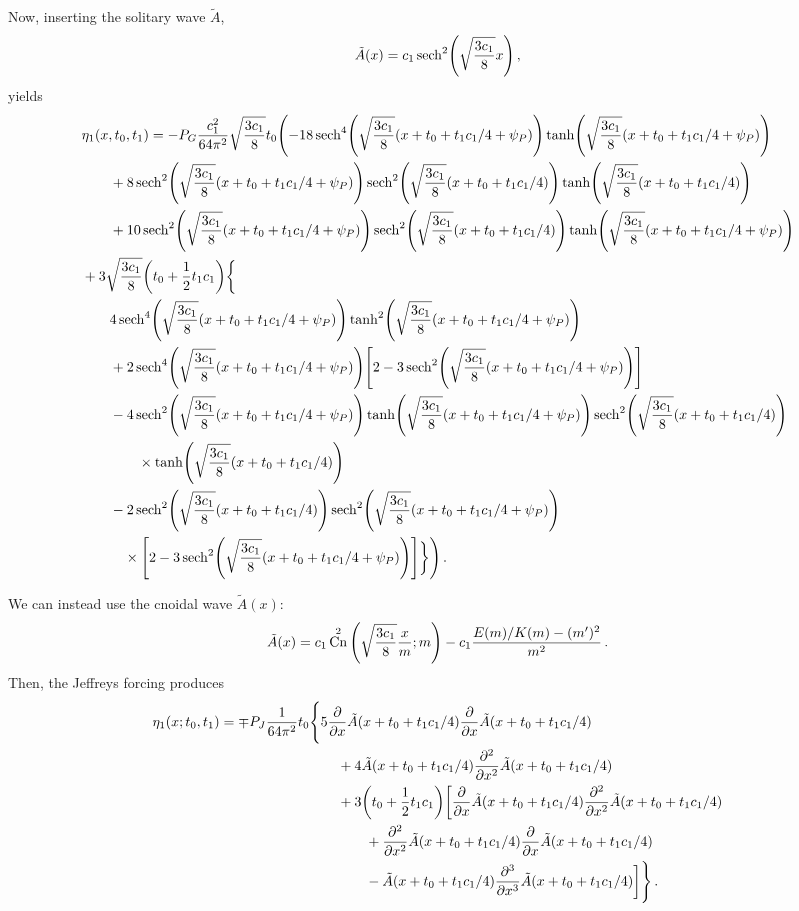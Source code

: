 \documentclass{jfm}
\DeclareMathOperator{\cn}{Cn}
\begin{document}
Now, inserting the solitary wave $\tilde{A}$,
\[
  \tilde{A}(x) = c_1 \sech[2](\sqrt{\frac{3 c_1}{8}} x) \,,
\]
yields
\begin{align*}
  &\eta_1(x,t_0,t_1) =
  -P_G \frac{c_1^2}{64 \pi^2} \sqrt{\frac{3 c_1}{8}} t_0
  \Biggl(
    -18 \sech[4](\sqrt{\frac{3 c_1}{8}} (x+t_0+t_1 c_1/4 + \psi_P))
    \tanh(\sqrt{\frac{3 c_1}{8}} (x+t_0+t_1 c_1/4 + \psi_P)) \\
  &\qquad
    +8 \sech[2](\sqrt{\frac{3 c_1}{8}} (x+t_0+t_1 c_1/4 + \psi_P))
    \sech[2](\sqrt{\frac{3 c_1}{8}} (x+t_0+t_1 c_1/4))
    \tanh(\sqrt{\frac{3 c_1}{8}} (x+t_0+t_1 c_1/4)) \\
  &\qquad
    +10 \sech[2](\sqrt{\frac{3 c_1}{8}} (x+t_0+t_1 c_1/4 + \psi_P))
    \sech[2](\sqrt{\frac{3 c_1}{8}} (x+t_0+t_1 c_1/4))
    \tanh(\sqrt{\frac{3 c_1}{8}} (x+t_0+t_1 c_1/4+\psi_P)) \\
  &
    + 3 \sqrt{\frac{3 c_1}{8}} \pqty{t_0+\frac{1}{2} t_1 c_1} \biggl\{ \\
  &\qquad
    4 \sech[4](\sqrt{\frac{3 c_1}{8}} (x+t_0+t_1 c_1/4 + \psi_P))
    \tanh[2](\sqrt{\frac{3 c_1}{8}} (x+t_0+t_1 c_1/4+\psi_P)) \\
  &\qquad
    +2 \sech[4](\sqrt{\frac{3 c_1}{8}} (x+t_0+t_1 c_1/4 + \psi_P))
    \bqty{2 - 3 \sech[2](\sqrt{\frac{3 c_1}{8}} (x+t_0+t_1 c_1/4 + \psi_P))} \\
  &\qquad
    -4 \sech[2](\sqrt{\frac{3 c_1}{8}} (x+t_0+t_1 c_1/4 + \psi_P))
    \tanh(\sqrt{\frac{3 c_1}{8}} (x+t_0+t_1 c_1/4 + \psi_P))
    \sech[2](\sqrt{\frac{3 c_1}{8}} (x+t_0+t_1 c_1/4)) \\
  &\qquad\qquad \times
    \tanh(\sqrt{\frac{3 c_1}{8}} (x+t_0+t_1 c_1/4)) \\
  &\qquad
    -2 \sech[2](\sqrt{\frac{3 c_1}{8}} (x+t_0+t_1 c_1/4))
    \sech[2](\sqrt{\frac{3 c_1}{8}} (x+t_0+t_1 c_1/4 + \psi_P)) \\
  &\qquad\quad\times
    \bqty{2-3 \sech[2](\sqrt{\frac{3 c_1}{8}} (x+t_0+t_1 c_1/4 + \psi_P))}
    \biggr\}
  \Biggr)
 \,.
\end{align*}

We can instead use the cnoidal wave $\tilde{A}(x)$:
\[
  \tilde{A}(x) = c_1 \cn^2 \pqty{\sqrt{\frac{3 c_1}{8}} \frac{x}{m} ; m}
  - c_1 \frac{E(m)/K(m)-(m')^2}{m^2} \,.
\]
Then, the Jeffreys forcing produces
\begin{align*}
  \eta_1(x;t_0,t_1) =
  \mp P_J \frac{1}{64 \pi^2} t_0 &\Biggl\{
    5 \pdv{x} \tilde{A}(x+t_0+t_1 c_1/4) \pdv{x}\tilde{A}(x+t_0+t_1 c_1/4) \\
    &\qquad
    + 4 \tilde{A}(x+t_0+t_1 c_1/4) \pdv[2]{x} \tilde{A}(x+t_0+t_1 c_1/4) \\
    &\qquad
    + 3 \pqty{t_0+\frac{1}{2} t_1 c_1} \biggl[
    \pdv{x} \tilde{A}(x+t_0+t_1 c_1/4) \pdv[2]{x} \tilde{A}(x+t_0+t_1 c_1/4) \\
    &\qquad\qquad
    + \pdv[2]{x} \tilde{A}(x+t_0+t_1 c_1/4) \pdv{x} \tilde{A}(x+t_0+t_1 c_1/4) \\
    &\qquad\qquad
    - \tilde{A}(x+t_0+t_1 c_1/4) \pdv[3]{x} \tilde{A}(x+t_0+t_1 c_1/4)
  \biggr]
  \Biggr\} \,.
\end{align*}
\end{document}
